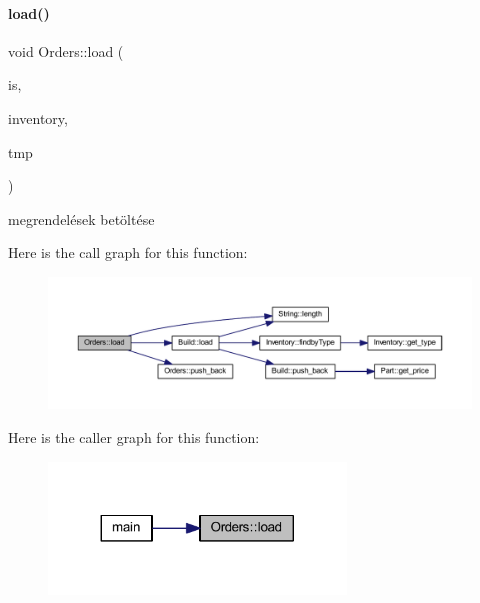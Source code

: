 \paragraph{\texorpdfstring{load()}{load()}}
{\footnotesize\ttfamily void Orders\+::load (\begin{DoxyParamCaption}\item[{std\+::fstream \&}]{is,  }\item[{\mbox{\hyperlink{class_inventory}{Inventory}} \&}]{inventory,  }\item[{\mbox{\hyperlink{struct_temp_input}{Temp\+Input}} \&}]{tmp }\end{DoxyParamCaption})}



megrendelések betöltése 

Here is the call graph for this function\+:
\nopagebreak
\begin{figure}[H]
\begin{center}
\leavevmode
\includegraphics[width=350pt]{class_orders_af0edb320aab3dcae0ee615a5459b5595_cgraph}
\end{center}
\end{figure}
Here is the caller graph for this function\+:
\nopagebreak
\begin{figure}[H]
\begin{center}
\leavevmode
\includegraphics[width=224pt]{class_orders_af0edb320aab3dcae0ee615a5459b5595_icgraph}
\end{center}
\end{figure}
\mbox{\label{class_orders_aab4445872bb7f3d952ebc89f6b2bd146}} 
